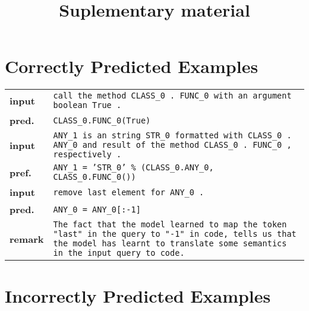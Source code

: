 \documentclass{article}
\title{Suplementary material}
\author{}
\date{}
\begin{document}
  \maketitle

  \section{Correctly Predicted Examples}

  \begin{tabular}{ l p{}}
    \hline
		\textbf{input} & \texttt{call the method CLASS\_0 . FUNC\_0 with an argument boolean True .} \\
    \textbf{pred.} & \texttt{CLASS\_0.FUNC\_0(True)} \\
    \hline
		\textbf{input} & \texttt{ANY\_1 is an string STR\_0 formatted with CLASS\_0 . ANY\_0 and 
                      result of the method CLASS\_0 . FUNC\_0 , respectively .}	\\
		\textbf{pref.} & \texttt{ANY\_1 = 'STR\_0' \% (CLASS\_0.ANY\_0, CLASS\_0.FUNC\_0())} \\
    \hline
    \textbf{input} & \texttt{remove last element for ANY\_0 .} \\
    \textbf{pred.} & \texttt{ANY\_0 = ANY\_0[:-1]} \\
    \textbf{remark}& \texttt{The fact that the model learned to map the token "last" in the 
                     query to "-1" in code, tells us that the model has learnt to translate some 
                     semantics in the input query to code.} \\
    \hline
  \end{tabular}

  \section{Incorrectly Predicted Examples}
\end{document}
